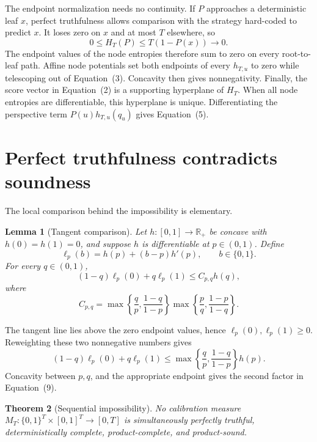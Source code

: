 \documentclass{article}
\newtheorem{theorem}{Theorem}
\newtheorem{lemma}[theorem]{Lemma}
\theoremstyle{definition}
\theoremstyle{remark}
\newcommand{\1}{\mathbf 1}
\begin{document}
The endpoint normalization needs no continuity. If \(P\) approaches a deterministic leaf \(x\), perfect truthfulness allows comparison with the strategy hard-coded to predict \(x\). It loses zero on \(x\) and at most \(T\) elsewhere, so \[ 0\le H_T(P)\le T(1-P(x))\longrightarrow0. \tag{8} \] The endpoint values of the node entropies therefore sum to zero on every root-to-leaf path. Affine node potentials set both endpoints of every \(h_{T,u}\) to zero while telescoping out of Equation~(3). Concavity then gives nonnegativity. Finally, the score vector in Equation~(2) is a supporting hyperplane of \(H_T\). When all node entropies are differentiable, this hyperplane is unique. Differentiating the perspective term \(P(u)h_{T,u}(q_u)\) gives Equation~(5).

\section{Perfect truthfulness contradicts soundness}

The local comparison behind the impossibility is elementary.

\begin{lemma}[Tangent comparison]\label{lem:tangent}
Let \(h:[0,1]\to\mathbb R_+\) be concave with \(h(0)=h(1)=0\), and suppose \(h\) is differentiable at \(p\in(0,1)\). Define \[ \ell_p(b)=h(p)+(b-p)h'(p),\qquad b\in\{0,1\}. \] For every \(q\in(0,1)\), \[ (1-q)\ell_p(0)+q\ell_p(1)\le C_{p,q}h(q), \tag{9} \] where \[ C_{p,q}=\max\left\{\frac q p,\frac{1-q}{1-p}\right\} \max\left\{\frac p q,\frac{1-p}{1-q}\right\}. \]
\end{lemma}

The tangent line lies above the zero endpoint values, hence \(\ell_p(0),\ell_p(1)\ge0\). Reweighting these two nonnegative numbers gives \[ (1-q)\ell_p(0)+q\ell_p(1) \le \max\left\{\frac q p,\frac{1-q}{1-p}\right\}h(p). \] Concavity between \(p,q\), and the appropriate endpoint gives the second factor in Equation~(9).

\begin{theorem}[Sequential impossibility]\label{thm:impossibility}
No calibration measure \(M_T:\{0,1\}^T\times[0,1]^T\to[0,T]\) is simultaneously perfectly truthful, deterministically complete, product-complete, and product-sound.
\end{theorem}
\end{document}
